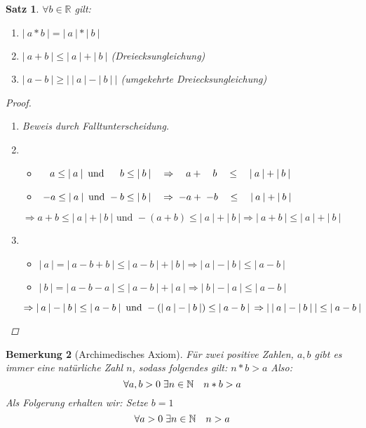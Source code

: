 \documentclass[a4paper,titlepage,oneside]{article}
\def\N{\ensuremath{\mathbb{N}} }
\def\R{\ensuremath{\mathbb{R}} }
\def\fa{\ensuremath{\forall}}
\def\ex{\ensuremath{\exists}}
\def\sp{\hspace{0,1cm}}
\newcommand{\abs}[1]{\ensuremath{\left|\:#1\:\right|}}
\theoremstyle{thmstyle}
\newtheorem{satz}{Satz}[subsection]
\newtheorem{bem}[satz]{Bemerkung}
\begin{document}
\begin{satz}
\(\fa b \in \R\) gilt:
\begin{enumerate}[label=(\arabic*)]
	\item \(\abs{a * b} = \abs{a} * \abs{b}\)
	\item \(\abs{a + b} \le \abs{a} + \abs{b}\) (Dreiecksungleichung)
	\item \(\abs{a - b} \ge \abs{\abs{a} - \abs{b}}\) (umgekehrte Dreiecksungleichung)
\end{enumerate}
\begin{proof}\sp
\begin{enumerate}[label=(\arabic*)]
	\item Beweis durch Falltunterscheidung.
	\item \begin{itemize}
		\item \(\quad a \le \abs{a} \text{ und } \sp \quad b \le \abs{b} \quad \Rightarrow \quad a + \quad b \quad\le\quad \abs{a}+\abs{b} \)
		\item \(\sp-a \le \abs{a} \text{ und } -b \le \abs{b} \quad \Rightarrow \sp -a + \sp -b \quad\le\quad \abs{a} +\abs{b} \)
		\end{itemize}
		\(\Rightarrow a + b \le \abs{a} + \abs{b} \text{ und } -(a + b) \le \abs{a} + \abs{b} \Rightarrow \abs{a + b} \le \abs{a} + \abs{b} \)
	\item \begin{itemize}
		\item \(\abs{a} = \abs{a - b + b} \le \abs{a - b} + \abs{b} \Rightarrow \abs{a} - \abs{b} \le \abs{a-b}\)
		\item \(\abs{b} = \abs{a - b - a} \le \abs{a - b} + \abs{a} \Rightarrow \abs{b} - \abs{a} \le \abs{a-b}\)
		\end{itemize}
		\(\Rightarrow \abs{a} - \abs{b} \le \abs{a-b} \text{ und } - (\abs{a} - \abs{b}) \le \abs{a-b} \\
	\Rightarrow \abs{\abs{a} - \abs{b}} \le \abs{a-b}\)
\end{enumerate}
\end{proof}
\end{satz}

\begin{bem}[Archimedisches Axiom]
Für zwei positive Zahlen, \(a, b\) gibt es immer eine natürliche Zahl $n$, sodass folgendes gilt: \(n * b > a\) Also:
\[\fa a,b > 0 \sp \ex n \in \N \quad n * b > a\]
Als Folgerung erhalten wir: Setze \(b = 1\)
\[\fa a > 0 \sp \ex n \in \N \quad n > a\]
\end{bem}
\end{document}
